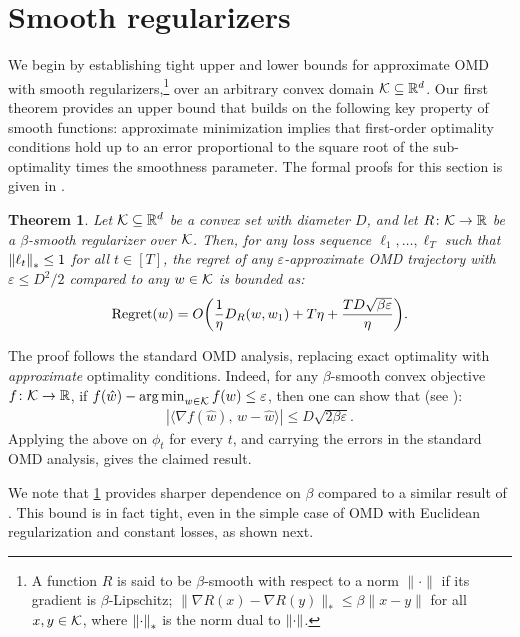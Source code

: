 \documentclass[10pt]{article}
\let\cite\citep
\newtheorem{theorem}{Theorem}
\theoremstyle{definition}
\theoremstyle{remark}
\renewcommand{\epsilon}{\varepsilon}
\newcommand{\rr}{\mathbb{R}}
\newcommand{\R}{\mathbb{R}}
\newcommand\inprod[2]{\langle #1,\,#2 \rangle}
\newcommand{\roundy}[1]{ {\left( #1 \right)}}
\newcommand{\abs}[1]{ {\left | #1 \right |}}
\newcommand{\reg}{{\rm Regret}}
\begin{document}
\section{Smooth regularizers}\label{sec:smooth}
We begin by establishing tight upper and lower bounds for approximate OMD with smooth regularizers,\footnote{A function $R$ is said to be $\beta$-smooth with respect to a norm $\|\cdot\|$ if its gradient is $\beta$-Lipschitz; 
$
    \|\nabla R(x) - \nabla R(y)\|_* \le \beta \|x-y\|
$ for all $x,y \in \mathcal K$, where $\norm{\cdot}_*$ is the norm dual to $\norm{\cdot}$.}
%
over an arbitrary convex domain $\cK \subseteq \R^d$.
Our first theorem provides an upper bound that builds on the following key property of smooth functions: approximate minimization implies that first-order optimality conditions hold up to an error proportional to the square root of the sub-optimality times the smoothness parameter. The formal proofs for this section is given in .

\begin{theorem}
\label{thm:ub_smooth}
Let $\cK \subseteq \R^d$ be a convex set with diameter $D$, and let $R \colon\cK\to \rr$ be a $\beta$-smooth regularizer over $\mathcal K$.
Then, for any loss sequence $\ell_1, \dots, \ell_T$ such that $\norm{\ell_t}_* \le 1$ for all $t\in[T]$, the regret of any $\epsilon$-approximate OMD trajectory with $\epsilon \le D^2/2$ compared to any $w \in \mathcal K$ is bounded as:
\begin{align*}
    \reg(w) = O\roundy{\frac{1}{\eta}D_R(w, w_1) + T\eta + \frac{TD\sqrt{\beta\epsilon}}{\eta}}
    .
\end{align*}
\end{theorem}
% 
The proof follows the standard OMD analysis, replacing exact optimality with \emph{approximate} optimality conditions.
Indeed, for any $\beta$-smooth convex objective $f\colon \cK \to \R$, if $f(\hat w) - \argmin_{w\in \cK}f(w) \le  \epsilon$, then one can show that (see ):
% 
\begin{align}\label{eq:approx_oc_ub_smooth}
    \abs{\inprod{\nabla f(\hat{w})}{w - \hat{w}}} \le D\sqrt{
    2\beta\epsilon}.
\end{align}
% 
Applying the above on $\phi_t$ for every $t$, and carrying the errors in the standard OMD analysis, gives the claimed result.

We note that \cref{thm:ub_smooth} provides sharper dependence on $\beta$ compared to a similar result of \cite{choi2023inexact}. 
This bound is in fact tight, even in the simple case of OMD with Euclidean regularization and constant losses, as shown next.
\end{document}
